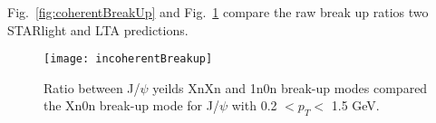     Fig.~\ref{fig:coherentBreakUp} and Fig.~\ref{fig:incoherentBreakUp} compare
      the raw break up ratios two STARlight and LTA predictions. 
    \DIFdelbegin %

\DIFdelend \begin{figure}[!Hhtb]
      \centering
      \texttt{[image: incoherentBreakup]}
      \caption{Ratio between J/$\psi$ yeilds XnXn and 1n0n break-up modes 
        compared the Xn0n break-up mode for J/$\psi$ with 0.2 $< p_{T} <$ 
        1.5 GeV.}
      \label{fig:incoherentBreakUp}
    \end{figure}

    \DIFdelbegin {}%

{%
}
\DIFdel{-}%
\DIFdel{-}%

